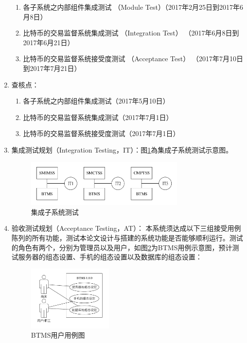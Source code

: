 \begin{enumerate}
	 			\begin{enumerate}
	 				\item 各子系统之内部组件集成测试 （Module Test）（2017年2月25日到2017年6月8日）
	 				\item 比特币的交易监督系统集成测试 （Integration Test） （2017年6月8日到2017年6月21日）
	 				\item 比特币的交易监督系统接受度测试 （Acceptance Test） （2017年7月10日到2017年7月21日）
				\end{enumerate}

			\item 查核点：

				\begin{enumerate}
	 				\item 各子系统之内部组件集成测试（2017年5月10日）
	 				\item 比特币的交易监督系统集成测试（2017年7月1日）
	 				\item 比特币的交易监督系统接受度测试（2017年7月1日）
	 			\end{enumerate}

	 		\item 集成测试规划（Integration Testing，IT）：图\ref{IntegrationTesting}為集成子系统测试示意图。
	 			\begin{figure}[!htbp]
					\centering
					\includegraphics[width = 0.75\textwidth]{IntegrationTesting.pdf}
					\caption{集成子系统测试}\label{IntegrationTesting}
				\end{figure}
			\item 验收测试规划（Acceptance Testing，AT）：
				本系统须达成以下三组接受用例陈列的所有功能，测试本论文设计与搭建的系统功能是否能够顺利运行。测试的角色有两个，分别为管理员以及用户，如图\ref{usecasediagram}为BTMS用例示意图，预计测试服务器的组态设置、手机的组态设置以及数据库的组态设置：

					\begin{figure}[!htbp]
						\centering
						\includegraphics[width = 0.4\textwidth]{usecasediagram.pdf}
						\caption{BTMS用户用例图}\label{usecasediagram}
					\end{figure}


\end{enumerate}
